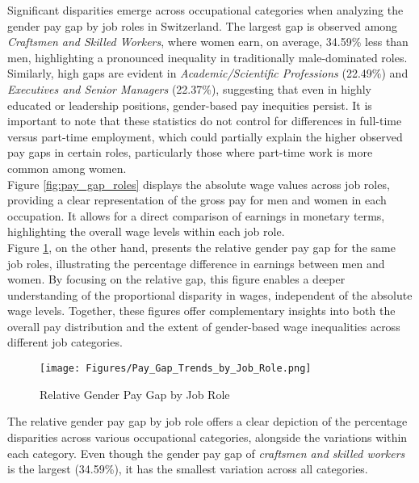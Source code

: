 \documentclass{article}
\begin{document}
Significant disparities emerge across occupational categories when analyzing the gender pay gap by job roles in Switzerland. The largest gap is observed among \textit{Craftsmen and Skilled Workers}, where women earn, on average, 34.59\% less than men, highlighting a pronounced inequality in traditionally male-dominated roles. Similarly, high gaps are evident in \textit{Academic/Scientific Professions} (22.49\%) and \textit{Executives and Senior Managers} (22.37\%), suggesting that even in highly educated or leadership positions, gender-based pay inequities persist. It is important to note that these statistics do not control for differences in full-time versus part-time employment, which could partially explain the higher observed pay gaps in certain roles, particularly those where part-time work is more common among women.\\


 Figure \ref{fig:pay_gap_roles} displays the absolute wage values across job roles, providing a clear representation of the gross pay for men and women in each occupation. It allows for a direct comparison of earnings in monetary terms, highlighting the overall wage levels within each job role.\\

Figure \ref{relative_gap_roles}, on the other hand, presents the relative gender pay gap for the same job roles, illustrating the percentage difference in earnings between men and women. By focusing on the relative gap, this figure enables a deeper understanding of the proportional disparity in wages, independent of the absolute wage levels. Together, these figures offer complementary insights into both the overall pay distribution and the extent of gender-based wage inequalities across different job categories.\\

\begin{figure}[h]
    \centering
    \texttt{[image: Figures/Pay\_Gap\_Trends\_by\_Job\_Role.png]}
    \caption{Relative Gender Pay Gap by Job Role}
    \label{relative_gap_roles}
\end{figure}

The relative gender pay gap by job role offers a clear depiction of the percentage disparities across various occupational categories, alongside the variations within each category. Even though the gender pay gap of \textit{craftsmen and skilled workers} is the largest (34.59\%), it has the smallest variation across all categories.\\
\end{document}
